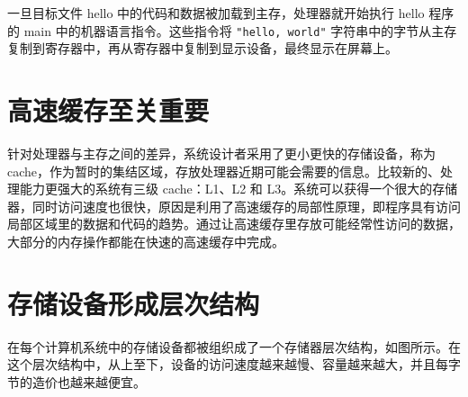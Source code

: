 一旦目标文件 hello 中的代码和数据被加载到主存，处理器就开始执行 hello 程序的 main 中的机器语言指令。这些指令将 \texttt{"hello, world\n"} 字符串中的字节从主存复制到寄存器中，再从寄存器中复制到显示设备，最终显示在屏幕上。

\section{高速缓存至关重要}

针对处理器与主存之间的差异，系统设计者采用了更小更快的存储设备，称为 cache，作为暂时的集结区域，存放处理器近期可能会需要的信息。比较新的、处理能力更强大的系统有三级 cache：L1、L2 和 L3。系统可以获得一个很大的存储器，同时访问速度也很快，原因是利用了高速缓存的局部性原理，即程序具有访问局部区域里的数据和代码的趋势。通过让高速缓存里存放可能经常性访问的数据，大部分的内存操作都能在快速的高速缓存中完成。

\section{存储设备形成层次结构}

在每个计算机系统中的存储设备都被组织成了一个存储器层次结构，如图所示。在这个层次结构中，从上至下，设备的访问速度越来越慢、容量越来越大，并且每字节的造价也越来越便宜。

